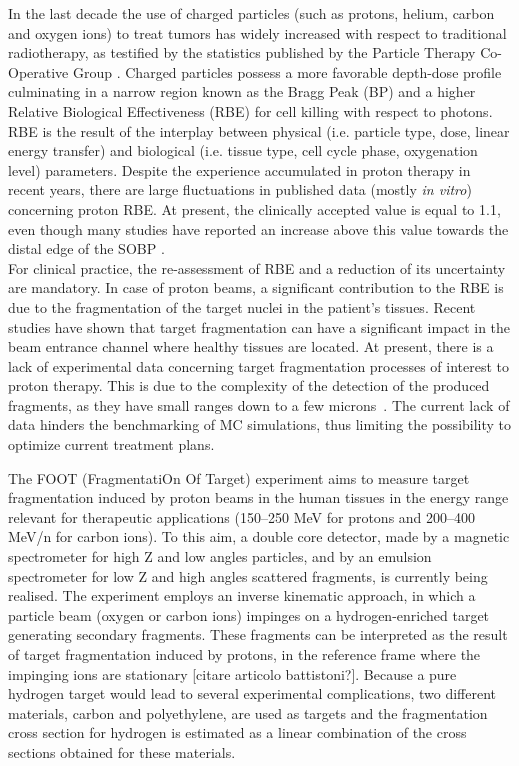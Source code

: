 \documentclass[utf8]{frontiersFPHY} %
\begin{document}
In the last decade the use of charged particles (such as protons, helium, carbon and oxygen ions) to treat tumors has widely increased with respect to traditional radiotherapy, as testified by the statistics published by the Particle Therapy Co-Operative Group \cite{ptcog}. Charged particles possess a more favorable depth-dose profile culminating in a narrow region known as the Bragg Peak (BP) and a higher Relative Biological Effectiveness (RBE) for cell killing with respect to photons. \\
RBE is the result of the interplay between physical (i.e. particle type, dose, linear energy transfer) and biological (i.e. tissue type, cell cycle phase, oxygenation level) parameters. Despite the experience accumulated in proton therapy in recent years, there are large fluctuations in published data (mostly \textit{in vitro}) concerning proton RBE. At present, the clinically accepted value is equal to 1.1, even though many studies have reported an increase above this value towards the distal edge of the SOBP \cite{tang, grun2013physical}. \\
For clinical practice, the re-assessment of RBE and a reduction of its uncertainty are mandatory. In case of proton beams, a significant contribution to the RBE is due to the fragmentation of the target nuclei in the patient's tissues. Recent studies \cite{trento2021} have shown that target fragmentation can have a significant impact in the beam entrance channel where healthy tissues are located. At present, there is a lack of experimental data concerning target fragmentation processes of interest to proton therapy. This is due to the complexity of the detection of the produced fragments, as they have small ranges down to a few microns~\cite{Tommasino2015}. The current lack of data hinders the benchmarking of MC simulations, thus limiting the possibility to optimize current treatment plans. 

\noindent
The FOOT (FragmentatiOn Of Target) experiment aims to measure target fragmentation induced by proton beams in the human tissues in the energy range relevant for therapeutic applications (150–250 MeV for protons and 200–400 MeV/n for carbon ions).
To this aim, a double core detector, made by a magnetic spectrometer for high Z and low angles particles, and by an emulsion spectrometer for low Z and high angles scattered fragments, is currently being realised. The experiment employs an inverse kinematic approach, in which a particle beam (oxygen or carbon ions) impinges on a hydrogen-enriched target generating secondary fragments. These fragments can be interpreted as the result of target fragmentation induced by protons, in the reference frame where the impinging ions are stationary [citare articolo battistoni?]. Because a pure hydrogen target would lead to several experimental complications, two different materials, carbon and polyethylene, are used as targets and the fragmentation cross section for hydrogen is estimated as a linear combination of the cross sections obtained for these materials. 
\end{document}
